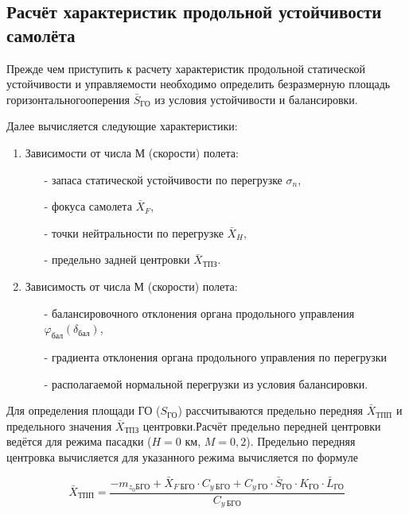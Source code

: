 \subsection{Расчёт характеристик продольной устойчивости самолёта}
\label{sec:Расчёт характеристик продольной устойчивости самолёта}
\pagestyle{fancy}
\fancyhf{}
\rfoot{\thepage}



Прежде чем приступить к расчету характеристик продольной статической устойчивости и управляемости необходимо определить безразмерную площадь горизонтальногооперения $\bar{S}_\text{ГО}$ из условия устойчивости и балансировки.

Далее вычисляется следующие характеристики:
\begin{enumerate}
    \item Зависимости от числа М (скорости) полета:
    \begin{itemize}
        \item [-] запаса статической устойчивости по перегрузке $\sigma_n$,
        \item [-] фокуса самолета $\bar{X}_F$,
        \item [-] точки нейтральности по перегрузке $\bar{X}_H$,
        \item [-] предельно задней центровки $\bar{X}_\text{ТПЗ}$.
    \end{itemize}
    \item Зависимость от числа М (скорости) полета:
    \begin{itemize}
        \item [-] балансировочного отклонения органа продольного управления $\varphi_\text{бал}(\delta_\text{бал})$,
        \item [-] градиента отклонения органа продольного управления по перегрузки
        \item [-] располагаемой нормальной перегрузки из условия балансировки.
    \end{itemize}
\end{enumerate}

Для определения площади ГО ($S_\text{ГО}$) рассчитываются предельно передняя $\bar{X}_\text{ТПП}$ и предельного значения $\bar{X}_\text{ТПЗ}$ центровки.Расчёт предельно передней центровки ведётся для режима пасадки ($H = 0$ км, $M = 0,2$). Предельно передняя центровка вычисляется для указанного режима вычисляется по формуле

\begin{equation}
    \label{eq:Предельно передняя центровка}
    \bar{X}_\text{ТПП} = \frac{-m_{z_0 \text{БГО}} + \bar{X}_{F \ \text{БГО}}  \cdot  C_{y \ \text{БГО}} + C_{y \ \text{ГО}} \cdot \bar{S}_\text{ГО} \cdot K_\text{ГО} \cdot \bar{L}_\text{ГО}}{C_{y \ \text{БГО}}}
\end{equation}

